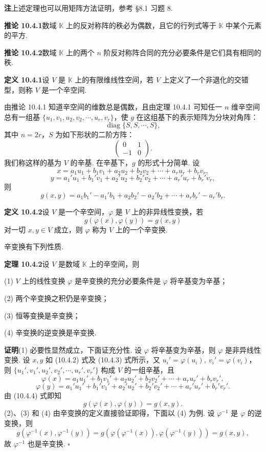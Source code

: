\documentclass[UTF8, 12pt, fontset=fandol, oneside]{ctexart}
\begin{document}
\noindent\textbf{注}\quad 上述定理也可以用矩阵方法证明，参考 §8.1 习题 8.

\noindent\textbf{推论 10.4.1}\quad 数域 $\mathbb K$ 上的反对称阵的秩必为偶数，且它的行列式等于 $\mathbb K$ 中某个元素的平方.

\noindent\textbf{推论 10.4.2}\quad 数域 $\mathbb K$ 上的两个 $n$ 阶反对称阵合同的充分必要条件是它们具有相同的秩.

\noindent\textbf{定义 10.4.1}\quad 设 $V$ 是 $\mathbb K$ 上的有限维线性空间，若 $V$ 上定义了一个非退化的交错型，则称 $V$ 是一个辛空间.

由推论 10.4.1 知道辛空间的维数总是偶数，且由定理 10.4.1 可知任一 $n$ 维辛空间总有一组基 $\{u_1,v_1,u_2,v_2,\cdots,u_r,v_r\}$，使 $g$ 在这组基下的表示矩阵为分块对角阵：
\[
  \operatorname{diag}\{S,S,\cdots,S\},
\]
其中 $n=2r$，$S$ 为如下形状的二阶方阵：
\[
  \left(\begin{array}{cc}
  0&1\\
  -1&0
  \end{array}\right).
\]
我们称这样的基为 $V$ 的辛基. 在辛基下，$g$ 的形式十分简单. 设
\begin{equation}
  x=a_1u_1+b_1v_1+a_2u_2+b_2v_2+\cdots+a_ru_r+b_rv_r,
  \tag{10.4.2}
\end{equation}
\begin{equation}
  y=a_1'u_1+b_1'v_1+a_2'u_2+b_2'v_2+\cdots+a_r'u_r+b_r'v_r,
  \tag{10.4.3}
\end{equation}
则
\begin{equation}
  g(x,y)=a_1b_1'-a_1'b_1+a_2b_2'-a_2'b_2+\cdots+a_rb_r'-a_r'b_r.
  \tag{10.4.4}
\end{equation}

\noindent\textbf{定义 10.4.2}\quad 设 $V$ 是一个辛空间，$\varphi$ 是 $V$ 上的非异线性变换，若
\[
  g(\varphi(x),\varphi(y))=g(x,y)
\]
对一切 $x,y\in V$ 成立，则 $\varphi$ 称为 $V$ 上的一个辛变换.

辛变换有下列性质.

\noindent\textbf{定理 10.4.2}\quad 设 $V$ 是数域 $\mathbb K$ 上的辛空间，则

(1) $V$ 上的线性变换 $\varphi$ 是辛变换的充分必要条件是 $\varphi$ 将辛基变为辛基；

(2) 两个辛变换之积仍是辛变换；

(3) 恒等变换是辛变换；

(4) 辛变换的逆变换是辛变换.

\noindent\textbf{证明}\quad (1) 必要性显然成立，下面证充分性. 设 $\varphi$ 将辛基变为辛基，则 $\varphi$ 是非异线性变换. 设 $x,y$ 如 (10.4.2) 式及 (10.4.3) 式所示，又 $u_i'=\varphi(u_i),\ v_i'=\varphi(v_i)$，则 $\{u_1',v_1',u_2',v_2',\cdots,u_r',v_r'\}$ 构成 $V$ 的一组辛基，且
\[
  \varphi(x)=a_1u_1'+b_1v_1'+a_2u_2'+b_2v_2'+\cdots+a_ru_r'+b_rv_r',
\]
\[
  \varphi(y)=a_1'u_1'+b_1'v_1'+a_2'u_2'+b_2'v_2'+\cdots+a_r'u_r'+b_r'v_r'.
\]
由 (10.4.4) 式即知
\[
  g(\varphi(x),\varphi(y))=g(x,y).
\]
(2)、(3) 和 (4) 由辛变换的定义直接验证即得，下面以 (4) 为例. 设 $\varphi^{-1}$ 是 $\varphi$ 的逆变换，则
\[
  g(\varphi^{-1}(x),\varphi^{-1}(y))
  =g(\varphi(\varphi^{-1}(x)),\varphi(\varphi^{-1}(y)))=g(x,y),
\]
故 $\varphi^{-1}$ 也是辛变换. $\square$
\end{document}
